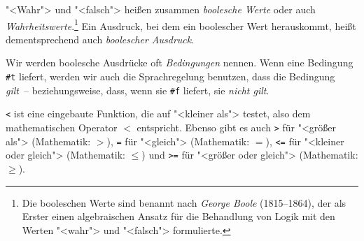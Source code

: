 "<Wahr"> und "<falsch"> heißen zusammen \textit{boolesche
  Werte} oder auch
\textit{Wahrheitswerte}.\footnote{Die booleschen
  Werte sind benannt nach \textit{George Boole} (1815--1864), der als
  Erster einen algebraischen Ansatz für die Behandlung von Logik mit
  den Werten "<wahr"> und "<falsch"> formulierte.}  Ein Ausdruck, bei
dem ein boolescher Wert herauskommt, heißt dementsprechend auch
\textit{boolescher Ausdruck}.

Wir werden boolesche Ausdrücke oft
\textit{Bedingungen} nennen.  Wenn eine Bedingung
\lstinline{#t} liefert, werden wir auch die Sprachregelung benutzen, dass
die Bedingung \textit{gilt}~-- beziehungsweise, dass, wenn sie
\lstinline{#f} liefert, sie \textit{nicht gilt}.

\lstinline{<}\indexvariable{<} ist eine eingebaute Funktion, die
auf "<kleiner als"> testet, also dem mathematischen Operator $<$
entspricht.  Ebenso gibt es auch \lstinline{>}\indexvariable{>} für
"<größer als"> (Mathematik: $>$), \lstinline{=}\indexvariable{=} für
"<gleich"> (Mathematik: $=$), \lstinline{<=}\indexvariable{<=} für "<kleiner oder
gleich"> (Mathematik: $\leq$) und \lstinline{>=}\indexvariable{>=}
für "<größer oder gleich"> (Mathematik: $\geq$).

